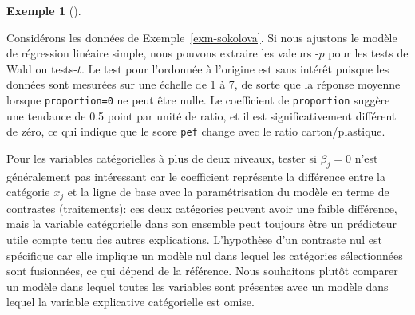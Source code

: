 \documentclass[
  11pt,
  letterpaper,
]{scrbook}
\newenvironment{Shaded}{\begin{snugshade}}{\end{snugshade}}
\newcommand{\CommentTok}[1]{\textcolor[rgb]{0.37,0.37,0.37}{#1}}
\newcommand{\FunctionTok}[1]{\textcolor[rgb]{0.28,0.35,0.67}{#1}}
\newcommand{\NormalTok}[1]{\textcolor[rgb]{0.00,0.23,0.31}{#1}}
\newcommand{\SpecialCharTok}[1]{\textcolor[rgb]{0.37,0.37,0.37}{#1}}
\theoremstyle{plain}
\theoremstyle{plain}
\theoremstyle{definition}
\newtheorem{example}{Exemple}[chapter]
\theoremstyle{definition}
\theoremstyle{remark}
\begin{document}
\begin{example}[]\protect\hypertarget{exm-sokolova-simple-ttest}{}\label{exm-sokolova-simple-ttest}

Considérons les données de Exemple~\ref{exm-sokolova}. Si nous ajustons
le modèle de régression linéaire simple, nous pouvons extraire les
valeurs -\(p\) pour les tests de Wald ou tests-\(t.\) Le test pour
l'ordonnée à l'origine est sans intérêt puisque les données sont
mesurées sur une échelle de 1 à 7, de sorte que la réponse moyenne
lorsque \texttt{proportion=0} ne peut être nulle. Le coefficient de
\texttt{proportion} suggère une tendance de 0.5 point par unité de
ratio, et il est significativement différent de zéro, ce qui indique que
le score \texttt{pef} change avec le ratio carton/plastique.

\begin{Shaded}
\end{Shaded}

\end{example}

Pour les variables catégorielles à plus de deux niveaux, tester si
\(\beta_j=0\) n'est généralement pas intéressant car le coefficient
représente la différence entre la catégorie \(x_j\) et la ligne de base
avec la paramétrisation du modèle en terme de contrastes (traitements):
ces deux catégories peuvent avoir une faible différence, mais la
variable catégorielle dans son ensemble peut toujours être un prédicteur
utile compte tenu des autres explications. L'hypothèse d'un contraste
nul est spécifique car elle implique un modèle nul dans lequel les
catégories sélectionnées sont fusionnées, ce qui dépend de la référence.
Nous souhaitons plutôt comparer un modèle dans lequel toutes les
variables sont présentes avec un modèle dans lequel la variable
explicative catégorielle est omise.
\end{document}
